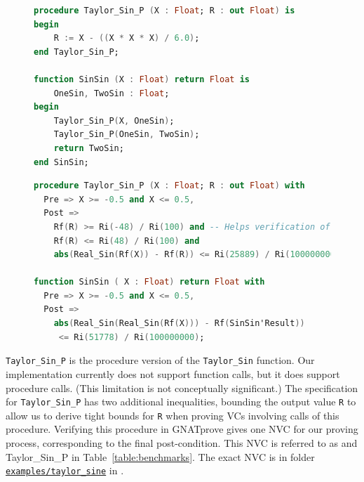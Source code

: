 \documentclass[runningheads]{llncs}
\begin{document}
\begin{figure}[ht]
\vspace{-2ex}
\begin{lstlisting}[caption=SinSin function definition in SPARK, language=ada, label={code:sinSinBody}]
procedure Taylor_Sin_P (X : Float; R : out Float) is
begin
    R := X - ((X * X * X) / 6.0);
end Taylor_Sin_P;

function SinSin (X : Float) return Float is
    OneSin, TwoSin : Float;
begin
    Taylor_Sin_P(X, OneSin);
    Taylor_Sin_P(OneSin, TwoSin);
    return TwoSin;
end SinSin;
\end{lstlisting}

\begin{lstlisting}[caption=SinSin function specification in SPARK, language=ada, label={code:sinSinSpec}]
procedure Taylor_Sin_P (X : Float; R : out Float) with
  Pre => X >= -0.5 and X <= 0.5,
  Post =>
    Rf(R) >= Ri(-48) / Ri(100) and -- Helps verification of calling functions
    Rf(R) <= Ri(48) / Ri(100) and       
    abs(Real_Sin(Rf(X)) - Rf(R)) <= Ri(25889) / Ri(100000000);

function SinSin ( X : Float) return Float with
  Pre => X >= -0.5 and X <= 0.5,
  Post =>
    abs(Real_Sin(Real_Sin(Rf(X))) - Rf(SinSin'Result))
     <= Ri(51778) / Ri(100000000);
\end{lstlisting}
\end{figure}

\lstinline{Taylor_Sin_P} is the procedure version of the \lstinline{Taylor_Sin} function. 
Our implementation currently does not support function calls, but it does support procedure calls. (This limitation is not conceptually significant.)
The specification for \lstinline{Taylor_Sin_P} has two additional inequalities, bounding the output value \lstinline{R} to allow us to derive tight bounds for \lstinline{R} when proving VCs involving calls of this procedure.
Verifying this procedure in GNATprove gives one NVC for our proving process, corresponding to the final post-condition.
This NVC is referred to as and Taylor\_Sin\_P in Table~\ref{table:benchmarks}.
The exact NVC is in folder \href{https://github.com/rasheedja/PropaFP/tree/master/examples/taylor_sine}{\texttt{examples/taylor\_sine}} in \cite{noauthor_rasheedjapropafp_nodate}.

\end{document}
